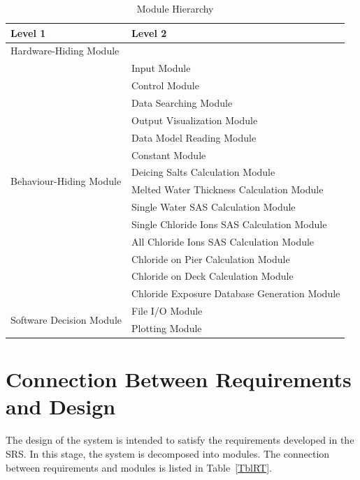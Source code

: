 \documentclass[12pt, titlepage]{article}
\begin{document}
\begin{table}[h!]
\centering
\begin{tabular}{p{} p{}}
\toprule
\textbf{Level 1} & \textbf{Level 2}\\
\midrule

{Hardware-Hiding Module} & ~ \\
\midrule

\multirow{14}{0.3\textwidth}{Behaviour-Hiding Module} & Input Module\\
& Control Module\\
& Data Searching Module\\
& Output Visualization Module\\
& Data Model Reading Module \\
& Constant Module \\
& Deicing Salts Calculation Module \\
& Melted Water Thickness Calculation Module \\
& Single Water SAS Calculation Module \\
& Single Chloride Ions SAS Calculation Module \\
& All Chloride Ions SAS Calculation Module \\
& Chloride on Pier Calculation Module \\
& Chloride on Deck Calculation Module \\
& Chloride Exposure Database Generation Module\\
\midrule

\multirow{2}{0.3\textwidth}{Software Decision Module} &  File I/O Module \\
& Plotting Module \\
\bottomrule

\end{tabular}
\caption{Module Hierarchy}
\label{TblMH}
\end{table}

\section{Connection Between Requirements and Design} \label{SecConnection}

The design of the system is intended to satisfy the requirements developed in
the SRS. In this stage, the system is decomposed into modules. The connection
between requirements and modules is listed in Table~\ref{TblRT}. 

\end{document}
